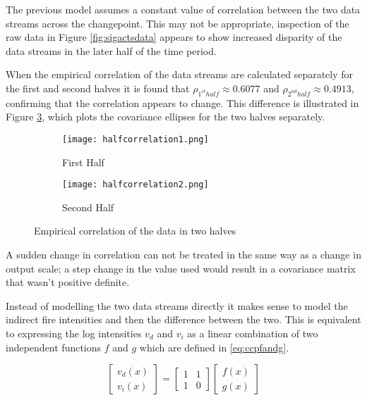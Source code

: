\documentclass[a4paper,11pt]{report}
\begin{document}
The previous model assumes a constant value of correlation between the two data streams across the changepoint. This may not be appropriate, inspection of the raw data in Figure \ref{fig:sigactsdata} appears to show increased disparity of the data streams in the later half of the time period. 

When the empirical correlation of the data streams are calculated separately for the first and second halves it is found that \(\rho_{1^{st} half} \approx 0.6077 \) and \(\rho_{2^{nd} half} \approx 0.4913\), confirming that the correlation appears to change. This difference is illustrated in Figure \ref{fig:halfcorrelation}, which plots the covariance ellipses for the two halves separately.  \par
 
\begin{figure}
\centering
\begin{subfigure}{.5\textwidth}
	\centering
	\texttt{[image: halfcorrelation1.png]}
  	\caption{First Half}
  	\label{fig:sub1}
\end{subfigure}%
\begin{subfigure}{.5\textwidth}
  	\centering
  	\texttt{[image: halfcorrelation2.png]}
  	\caption{Second Half}
 	 \label{fig:sub2}
\end{subfigure}
\caption{Empirical correlation of the data in two halves}
\label{fig:halfcorrelation}
\end{figure}

A sudden change in correlation can not be treated in the same way as a change in output scale; a step change in the value used would result in a covariance matrix that wasn't positive definite.

Instead of modelling the two data streams directly it makes sense to model the indirect fire intensities and then the difference between the two. This is equivalent to expressing the log intensities \(v_d\) and \(v_i\) as a linear combination of two independent functions \(f\) and \(g\) which are defined in \ref{eq:ccpfandg}.

\begin{equation} 
\left[ \begin{array}{cc}
v_{d}(x)  \\
v_{i}(x) \end{array} \right] = \left[ \begin{array}{cc}
1 & 1  \\
1  & 0 \end{array} \right] \left[ \begin{array}{cc}
f(x)  \\
g(x) \end{array} \right]
\end{equation}
\end{document}
